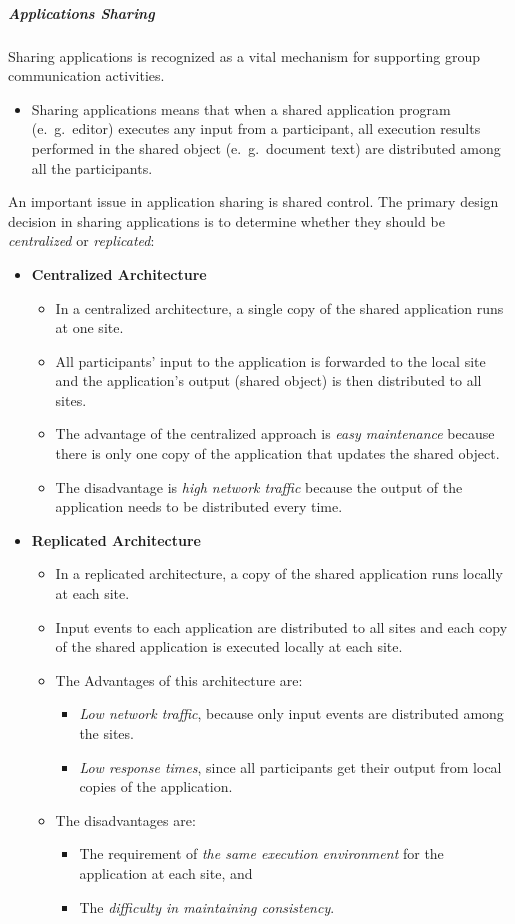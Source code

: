 \subparagraph{Applications Sharing}
Sharing applications is recognized as a vital mechanism for supporting group communication activities.
\begin{itemize}
	\item Sharing applications means that when a shared application program (e.\ g.\ editor) executes any input from a participant, all execution results performed in the shared object (e.\ g.\ document text) are distributed among all the participants. 
\end{itemize}

An important issue in application sharing is shared control. The primary design decision in sharing applications is to determine whether they should be \textit{centralized} or \textit{replicated}:

\begin{itemize}
	\item \textbf{Centralized Architecture}
	\begin{itemize}
		\item In a centralized architecture, a single copy of the shared application runs at
		one site. 
		\item All participants' input to the application is forwarded to the local site and the application’s output (shared object) is then distributed to all	sites.
		\item The advantage of the centralized approach is \textit{easy maintenance} because there is only one copy of the application that updates the shared object.
		\item The disadvantage is \textit{high network traffic} because the output of the application needs to be distributed every time.
	\end{itemize}
	
	\item \textbf{Replicated Architecture}
	\begin{itemize}
		\item In a replicated architecture, a copy of the shared application runs locally at each site. 
		\item Input events to each application are distributed to all sites and	each copy of the shared application is executed locally at each site.
		\item The Advantages of this architecture are:
		\begin{itemize}
			\item \textit{Low network traffic}, because only input events are distributed among the sites.
			\item \textit{Low response times}, since all participants get their output from local copies of the application.
		\end{itemize}
	\item The disadvantages are:
	\begin{itemize}
		\item The requirement of \textit{the same execution environment} for the application at each site, and 
		\item The \textit{difficulty in maintaining consistency}. 
	\end{itemize}
	\end{itemize}
\end{itemize}

